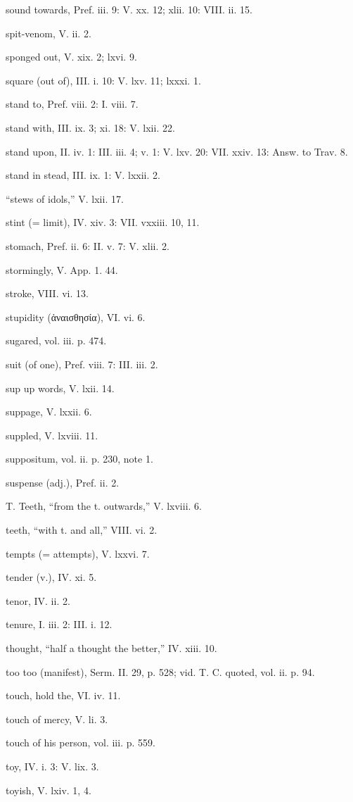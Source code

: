 sound towards, Pref. iii. 9: V. xx. 12; xlii. 10: VIII. ii. 15.

spit-venom, V. ii. 2.

sponged out, V. xix. 2; lxvi. 9.

square (out of), III. i. 10: V. lxv. 11; lxxxi. 1.

stand to, Pref. viii. 2: I. viii. 7.

stand with, III. ix. 3; xi. 18: V. lxii. 22.

stand upon, II. iv. 1: III. iii. 4; v. 1: V. lxv. 20: VII. xxiv. 13: Answ. to Trav. 8.

stand in stead, III. ix. 1: V. lxxii. 2.

“stews of idols,” V. lxii. 17.

stint (= limit), IV. xiv. 3: VII. vxxiii. 10, 11.

stomach, Pref. ii. 6: II. v. 7: V. xlii. 2.

stormingly, V. App. 1. 44.

stroke, VIII. vi. 13.

stupidity (ἀναισθησία), VI. vi. 6.

sugared, vol. iii. p. 474.

suit (of one), Pref. viii. 7: III. iii. 2.

sup up words, V. lxii. 14.

suppage, V. lxxii. 6.

suppled, V. lxviii. 11.

suppositum, vol. ii. p. 230, note 1.

suspense (adj.), Pref. ii. 2.

T.
Teeth, “from the t. outwards,” V. lxviii. 6.

teeth, “with t. and all,” VIII. vi. 2.

tempts (= attempts), V. lxxvi. 7.

tender (v.), IV. xi. 5.

tenor, IV. ii. 2.

tenure, I. iii. 2: III. i. 12.

thought, “half a thought the better,” IV. xiii. 10.

too too (manifest), Serm. II. 29, p. 528; vid. T. C. quoted, vol. ii. p. 94.

touch, hold the, VI. iv. 11.

touch of mercy, V. li. 3.

touch of his person, vol. iii. p. 559.

toy, IV. i. 3: V. lix. 3.

toyish, V. lxiv. 1, 4.

